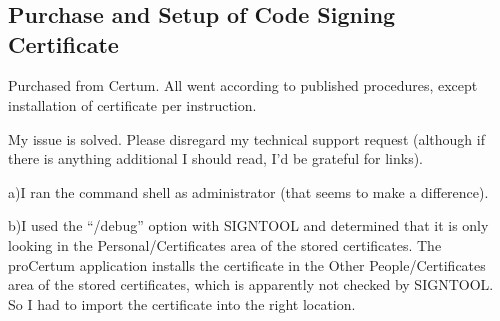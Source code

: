 \chapter{\cspszerotitle{}}

\label{csps0}

\section{Purchase and Setup of Code Signing Certificate}
\label{csps0:spsc0}

Purchased from Certum.  All went according to published procedures,
except installation of certificate per instruction.

My issue is solved.  Please disregard my technical support request (although if there is
anything additional I should read, I'd be grateful for links).

a)I ran the command shell as administrator (that seems to make a difference).

b)I used the ``/debug'' option with SIGNTOOL and determined that it is only looking in
the Personal/Certificates area of the stored certificates.  The proCertum application
installs the certificate in the Other People/Certificates area of the stored
certificates, which is apparently not checked by SIGNTOOL. 
So I had to import the certificate into the right location.

